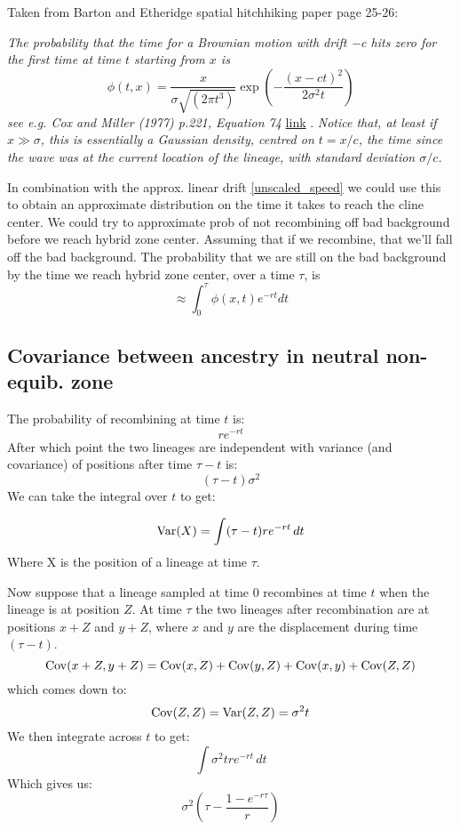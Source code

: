 \documentclass[12pt]{article}
\def\Var{\mathop{\rm Var}}
\def\Cov{\mathop{\rm Cov}}
\begin{document}
Taken from Barton and Etheridge spatial hitchhiking paper page 25-26:

\emph{The probability that the time for a Brownian motion with drift −c hits
zero for the first time at time $t$ starting from $x$ is}
\begin{equation}
\phi(t,x) = \frac{x}{\sigma\sqrt{(2\pi t^3)}} \exp
\left(-\frac{(x-ct)^2}{2\sigma^2 t} \right)
\end{equation}
\emph{see e.g. Cox and Miller (1977) p.221, Equation 74}
\href{http://books.google.com/books?hl=en&lr=&id=76QOAAAAQAAJ&oi=fnd&pg=PR9&dq=The+Theory+of+Stochastic+Processes+cox&ots=cBTJktzRam&sig=kc_3OsLxXMyVRXx9lIUJCCAEys4#v=onepage&q=The%20Theory%20of%20Stochastic%20Processes%20cox&f=false}{link}
.\emph{ Notice that, at
least if $x \gg \sigma$, this is essentially a Gaussian density, centred on $t =
x/c$, the time since the wave was at the current location of the
lineage, with standard deviation $\sigma/c$.}

In combination with the approx. linear drift \ref{unscaled_speed} we
could use this to obtain an approximate distribution on the time it
takes to reach the cline center. 
We could try to approximate prob of not recombining off bad background 
before we reach hybrid zone center. Assuming that if we recombine,
that we'll fall off the bad background.
 The probability that we are
still on the bad background by the time we reach hybrid zone center,
over a time $\tau$, is
\begin{equation}
\approx \int_0^\tau \phi(x,t) e^{-rt} dt
\end{equation}

\subsection{Covariance between ancestry in neutral non-equib. zone}

The probability of recombining at time $t$ is:
$$re^{-rt}$$
After which point the two lineages are independent with variance (and covariance) of positions after time $\tau-t$ is:
$$ (\tau-t)\sigma^2$$
We can take the integral over $t$ to get:

$$ \Var(X) = \int (\tau-t)re^{-rt} \,dt $$
Where X is the position of a lineage at time $\tau$.

Now suppose that a lineage sampled at time $0$ recombines at time $t$ when the lineage is at position $Z$. At time $\tau$ the two lineages after recombination are at positions $x + Z$ and $y + Z$, where $x$ and $y$ are the displacement during time $(\tau-t)$.
$$\Cov(x+Z,y+Z)=\Cov(x,Z)+\Cov(y,Z)+\Cov(x,y)+\Cov(Z,Z)$$
which comes down to:
	$$\Cov(Z,Z) = \Var(Z,Z) = \sigma^2 t$$
We then integrate across $t$ to get:
	$$\int \sigma^2tre^{-rt} \,dt$$
Which gives us: 
$$\sigma^2(\tau - \frac{1-e^{-r\tau}}{r})$$
\end{document}
